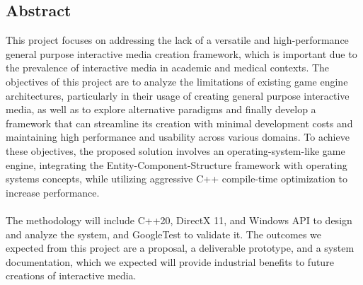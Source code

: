 \begin{adjustwidth}{0.5cm}{0.5cm}
    \section*{\normalsize Abstract}
    \vspace{-0.3cm}
    \normalsize
    This project focuses on addressing the lack of a versatile and high-performance general purpose interactive media
    creation framework, which is important due to the prevalence of interactive media in academic and medical contexts.
    The objectives of this project are to analyze the limitations of existing game engine architectures, particularly
    in their usage of creating general purpose interactive media, as well as to explore alternative paradigms and
    finally develop a framework that can streamline its creation with minimal development costs and maintaining high
    performance and usability across various domains.
    To achieve these objectives, the proposed solution involves an operating-system-like game engine, integrating
    the Entity-Component-Structure framework with operating systems concepts, while utilizing aggressive C++ compile-time
    optimization to increase performance.
    \\\\
    The methodology will include C++20, DirectX 11, and Windows API to design and analyze the system, and
    GoogleTest to validate it.
    The outcomes we expected from this project are a proposal, a deliverable prototype, and a system documentation,
    which we expected will provide industrial benefits to future creations of interactive media.

\end{adjustwidth}